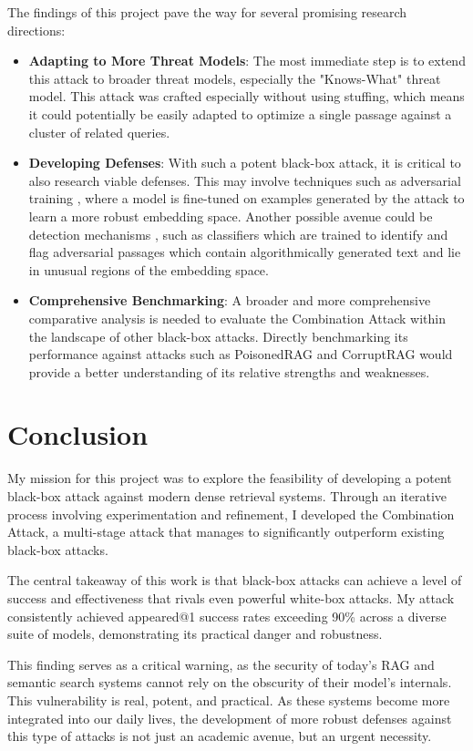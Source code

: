 \documentclass[a4paper, sigconf]{acmart}
\begin{document}
The findings of this project pave the way for several promising research directions:

\begin{itemize}
  \item \textbf{Adapting to More Threat Models}: The most immediate step is to extend this attack to broader threat models, especially the "Knows-What" threat model. This attack was crafted especially without using stuffing, which means it could potentially be easily adapted to optimize a single passage against a cluster of related queries. 
  \item \textbf{Developing Defenses}: With such a potent black-box attack, it is critical to also research viable defenses. This may involve techniques such as adversarial training \cite{zhao2024}, where a model is fine-tuned on examples generated by the attack to learn a more robust embedding space. Another possible avenue could be detection mechanisms \cite{kazoom2025}, such as classifiers which are trained to identify and flag adversarial passages which contain algorithmically generated text and lie in unusual regions of the embedding space.  
  \item \textbf{Comprehensive Benchmarking}: A broader and more comprehensive comparative analysis is needed to evaluate the Combination Attack within the landscape of other black-box attacks. Directly benchmarking its performance against attacks such as PoisonedRAG \cite{zou2025} and CorruptRAG \cite{zhang2025-prac} would provide a better understanding of its relative strengths and weaknesses.
\end{itemize}


\section{Conclusion}

My mission for this project was to explore the feasibility of developing a potent black-box attack against modern dense retrieval systems. Through an iterative process involving experimentation and refinement, I developed the Combination Attack, a multi-stage attack that manages to significantly outperform existing black-box attacks.

The central takeaway of this work is that black-box attacks can achieve a level of success and effectiveness that rivals even powerful white-box attacks. My attack consistently achieved appeared@1 success rates exceeding 90\% across a diverse suite of models, demonstrating its practical danger and robustness. 

This finding serves as a critical warning, as the security of today's RAG and semantic search systems cannot rely on the obscurity of their model's internals. This vulnerability is real, potent, and practical. As these systems become more integrated into our daily lives, the development of more robust defenses against this type of attacks is not just an academic avenue, but an urgent necessity. 


 

\end{document}
